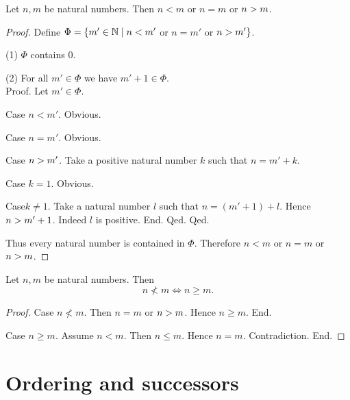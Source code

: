 \documentclass[../arithmetic.tex]{subfiles}
\begin{document}
  \begin{forthel}
    \begin{proposition}
      Let $n, m$ be natural numbers.
      Then $n \less m$ or $n = m$ or $n > m$.
    \end{proposition}
    \begin{proof}
      Define $\Phi = \{ m' \in \mathbb{N} \mid n < m'$ or $n = m'$ or $n > m' \}$.

      (1) $\Phi$ contains $0$.

      (2) For all $m' \in \Phi$ we have $m' \plus 1 \in \Phi$. \\
      Proof.
        Let $m' \in \Phi$.

        Case $n \less m'$. Obvious.

        Case $n = m'$. Obvious.

        Case $n > m'$.
          Take a positive natural number $k$ such that $n = m' \plus k$.

          Case $k = 1$. Obvious.

          Case$k \neq 1$.
            Take a natural number $l$ such that $n = (m' \plus 1) \plus l$.
            Hence $n > m' + 1$.
            Indeed $l$ is positive.
          End.
        Qed.
      Qed.

      Thus every natural number is contained in $\Phi$.
      Therefore $n \less m$ or $n = m$ or $n > m$.
    \end{proof}
  \end{forthel}

  \begin{forthel}
    \begin{proposition}
      Let $n, m$ be natural numbers.
      Then \[ n \nless m \iff n \geq m. \]
    \end{proposition}
    \begin{proof}
      Case $n \nless m$.
        Then $n = m$ or $n > m$.
        Hence $n \geq m$.
      End.

      Case $n \geq m$.
        Assume $n \less m$.
        Then $n \leq m$.
        Hence $n = m$.
        Contradiction.
      End.
    \end{proof}
  \end{forthel}


  \section{Ordering and successors}
\end{document}
